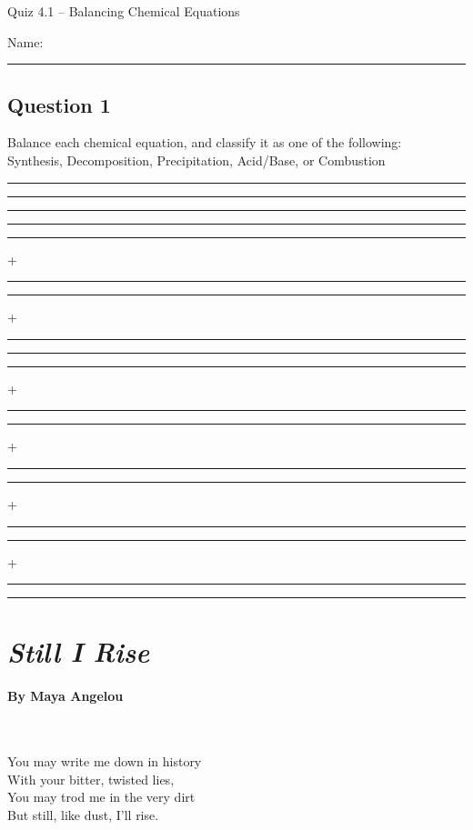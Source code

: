 \documentclass[11pt, letterpaper]{memoir}
\begin{document}
	\begin{center}
		{\large	Quiz 4.1 -- Balancing Chemical Equations}
	\end{center}
{\large Name: \rule[-1mm]{4in}{.1pt}
	
	\subsection*{Question 1}
	Balance each chemical equation, and classify it as one of the following: \\Synthesis, Decomposition, Precipitation, Acid/Base, or Combustion
	
	{\large
		\vspace{2em}
		\rule[-1mm]{0.35in}{.1pt}  \rule[-1mm]{0.35in}{.1pt} \rule[-1mm]{0.35in}{.1pt} \rule[-1mm]{0.35in}{.1pt}
		
		\vspace{5em}
		\rule[-1mm]{0.35in}{.1pt} + \rule[-1mm]{0.35in}{.1pt} \rule[-1mm]{0.35in}{.1pt} + \rule[-1mm]{0.35in}{.1pt}
			
		\vspace{5em}
		\rule[-1mm]{0.35in}{.1pt} \rule[-1mm]{0.35in}{.1pt} + \rule[-1mm]{0.35in}{.1pt}
		
		\vspace{5em}
		\rule[-1mm]{0.35in}{.1pt} + \rule[-1mm]{0.35in}{.1pt} \rule[-1mm]{0.35in}{.1pt} + \rule[-1mm]{0.35in}{.1pt}
		
		\vspace{5em}
		\rule[-1mm]{0.35in}{.1pt} + \rule[-1mm]{0.35in}{.1pt} \rule[-1mm]{0.35in}{.1pt}
	}
\newpage
\pagestyle{empty}
\addtocounter{page}{-1}
\section*{\emph{Still I Rise}}
\paragraph{By Maya Angelou}~

\vspace{1em}
\begin{minipage}[t]{0.49\linewidth}

	You may write me down in history\\
	With your bitter, twisted lies,\\
	You may trod me in the very dirt\\
	But still, like dust, I'll rise.


\end{minipage}}
\end{document}
